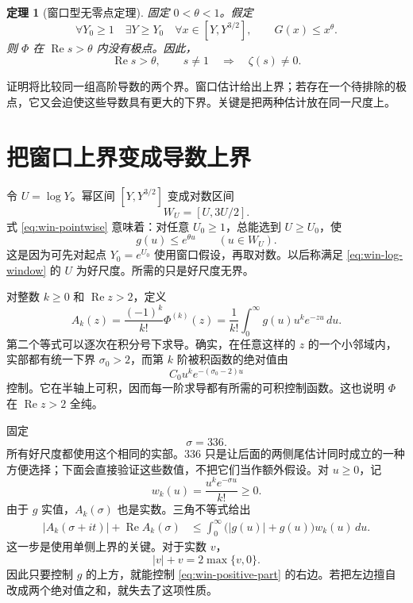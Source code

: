\documentclass[UTF8,fontset=fandol,a4paper,openany,oneside]{ctexbook}
\newtheorem{theorem}{定理}[chapter]
\theoremstyle{definition}
\theoremstyle{remark}
\begin{document}
\begin{theorem}[窗口型无零点定理]
\label{thm:window-zeta}
固定 $0<\theta<1$。假定
\begin{equation}
 \forall Y_0\ge1\quad
 \exists Y\ge Y_0\quad
 \forall x\in[Y,Y^{3/2}],
 \qquad G(x)\le x^\theta.
 \label{eq:win-pointwise}
\end{equation}
则 $\Phi$ 在 $\operatorname{Re}s>\theta$ 内没有极点。因此，
\[
 \operatorname{Re}s>\theta,\qquad s\ne1
 \quad\Longrightarrow\quad \zeta(s)\ne0.
\]
\end{theorem}

证明将比较同一组高阶导数的两个界。窗口估计给出上界；若存在一个待排除的极点，它又会迫使这些导数具有更大的下界。关键是把两种估计放在同一尺度上。

\section{把窗口上界变成导数上界}

令 $U=\log Y$。幂区间 $[Y,Y^{3/2}]$ 变成对数区间
\[
 W_U=[U,3U/2].
\]
式 \eqref{eq:win-pointwise} 意味着：对任意 $U_0\ge1$，总能选到 $U\ge U_0$，使
\begin{equation}
 g(u)\le e^{\theta u}\qquad(u\in W_U).
 \label{eq:win-log-window}
\end{equation}
这是因为可先对起点 $Y_0=e^{U_0}$ 使用窗口假设，再取对数。以后称满足 \eqref{eq:win-log-window} 的 $U$ 为好尺度。所需的只是好尺度无界。

对整数 $k\ge0$ 和 $\operatorname{Re}z>2$，定义
\begin{equation}
 A_k(z)=\frac{(-1)^k}{k!}\Phi^{(k)}(z)
       =\frac1{k!}\int_0^\infty g(u)u^ke^{-zu}\,du.
 \label{eq:win-Ak}
\end{equation}
第二个等式可以逐次在积分号下求导。确实，在任意这样的 $z$ 的一个小邻域内，实部都有统一下界 $\sigma_0>2$，而第 $k$ 阶被积函数的绝对值由
\[
 C_0u^ke^{-(\sigma_0-2)u}
\]
控制。它在半轴上可积，因而每一阶求导都有所需的可积控制函数。这也说明 $\Phi$ 在 $\operatorname{Re}z>2$ 全纯。

固定
\begin{equation}
 \sigma=336.
 \label{eq:win-sigma}
\end{equation}
所有好尺度都使用这个相同的实部。$336$ 只是让后面的两侧尾估计同时成立的一种方便选择；下面会直接验证这些数值，不把它们当作额外假设。对 $u\ge0$，记
\[
 w_k(u)=\frac{u^ke^{-\sigma u}}{k!}\ge0.
\]
由于 $g$ 实值，$A_k(\sigma)$ 也是实数。三角不等式给出
\begin{align}
 |A_k(\sigma+it)|+\operatorname{Re}A_k(\sigma)
 &\le \int_0^\infty \bigl(|g(u)|+g(u)\bigr)w_k(u)\,du.
 \label{eq:win-positive-part}
\end{align}
这一步是使用单侧上界的关键。对于实数 $v$，
\[
 |v|+v=2\max\{v,0\}.
\]
因此只要控制 $g$ 的上方，就能控制 \eqref{eq:win-positive-part} 的右边。若把左边擅自改成两个绝对值之和，就失去了这项性质。
\end{document}

